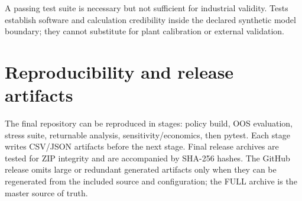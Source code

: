 \documentclass[11pt]{article}
\begin{document}
A passing test suite is necessary but not sufficient for industrial validity. Tests establish software and calculation credibility inside the declared synthetic model boundary; they cannot substitute for plant calibration or external validation.

\section{Reproducibility and release artifacts}
The final repository can be reproduced in stages: policy build, OOS evaluation, stress suite, returnable analysis, sensitivity/economics, then pytest. Each stage writes CSV/JSON artifacts before the next stage. Final release archives are tested for ZIP integrity and are accompanied by SHA-256 hashes. The GitHub release omits large or redundant generated artifacts only when they can be regenerated from the included source and configuration; the FULL archive is the master source of truth.
\end{document}
